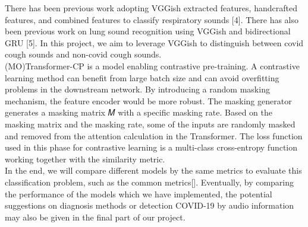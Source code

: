 \documentclass[11pt]{article}
\begin{document}
\noindent
There has been previous work adopting VGGish extracted features, handcrafted features, and combined
 features to classify respiratory sounds [4]. There has also been previous work on lung sound 
 recognition using VGGish and bidirectional GRU [5]. In this project, we aim to leverage VGGish to 
 distinguish between covid cough sounds and non-covid cough sounds. \\

 \noindent
(MO)Transformer-CP is a model enabling contrastive pre-training. A contrastive learning method can 
benefit from large batch size and can avoid overfitting problems in the downstream network. By 
introducing a random masking mechanism, the feature encoder would be more robust. The masking 
generator generates a masking matrix 𝑀 with a specific masking rate. Based on the masking matrix 
and the masking rate, some of the inputs are randomly masked and removed from the attention calculation 
in the Transformer. The loss function used in this phase for contrastive learning is a multi-class 
cross-entropy function working together with the similarity metric.\\

\noindent
In the end, we will compare different models by the same metrics to evaluate this classification 
problem, such as the common metrics[]. Eventually, by comparing the performance of the models which
 we have implemented, the potential suggestions on diagnosis methods or detection COVID-19 by audio 
 information may also be given in the final part of our project.


\newpage

\end{document}
